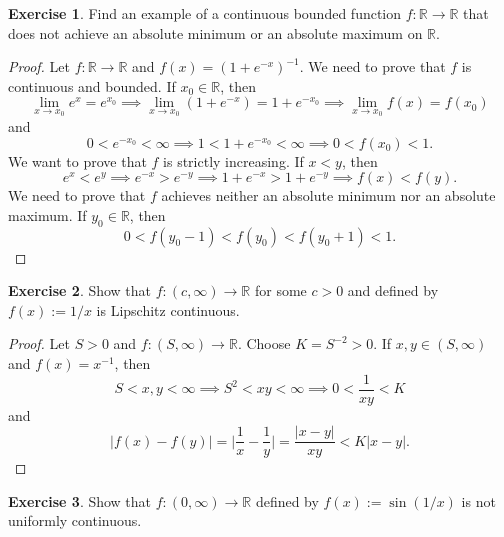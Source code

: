 \documentclass[12pt]{article}
\theoremstyle{definition}
\newtheorem{exercise}{Exercise}
\begin{document}
\thispagestyle{firstpage}

\begin{exercise}
    Find an example of a continuous bounded function \(f : \mathbb{R} \to \mathbb{R}\) that does not achieve an absolute minimum or an absolute maximum on \(\mathbb{R}\).
\end{exercise}

\begin{proof}
    Let \(f : \mathbb{R} \to \mathbb{R}\) and \(f(x) = (1 + e^{-x})^{-1}\). We need to prove that \(f\) is continuous and bounded. If \(x_0 \in \mathbb{R}\), then
    \[
        \lim_{x \to x_0}e^{x} = e^{x_0} \implies \lim_{x \to x_0}(1 + e^{-x}) = 1 + e^{-x_0} \implies \lim_{x \to x_0}f(x) = f(x_0)
    \]
    and
    \[
        0 < e^{-x_0} < \infty \implies 1 < 1 + e^{-x_0} < \infty \implies 0 < f(x_0) < 1.
    \]
    We want to prove that \(f\) is strictly increasing. If \(x < y\), then
    \[
        e^x < e^y \implies e^{-x} > e^{-y} \implies 1 + e^{-x} > 1 + e^{-y} \implies f(x) < f(y).
    \]
    We need to prove that \(f\) achieves neither an absolute minimum nor an absolute maximum. If \(y_0 \in \mathbb{R}\), then
    \[
        0 < f(y_0 - 1) < f(y_0) < f(y_0 + 1) < 1.
    \]
\end{proof}

\begin{exercise}
    Show that \(f : (c, \infty) \to \mathbb{R}\) for some \(c > 0\) and defined by \(f(x) := 1 / x\) is Lipschitz continuous.
\end{exercise}

\begin{proof}
    Let \(S > 0\) and \(f : (S, \infty) \to \mathbb{R}\). Choose \(K = S^{-2} > 0\). If \(x, y \in (S, \infty)\) and \(f(x) = x^{-1}\), then
    \[
        S < x,y < \infty \implies S^2 < xy < \infty \implies 0 < \frac{1}{xy} < K
    \]
    and
    \[
        \vert f(x) - f(y) \vert = \bigg\vert \frac{1}{x} - \frac{1}{y} \bigg\vert = \frac{\vert x - y \vert}{xy} < K \vert x - y \vert.
    \]
\end{proof}

\begin{exercise}
    Show that \(f : (0, \infty) \to \mathbb{R}\) defined by \(f(x) := \sin(1 /x)\) is not uniformly continuous.
\end{exercise}
\end{document}
